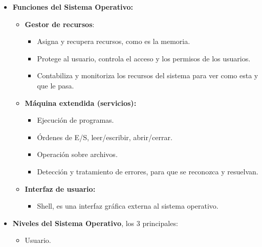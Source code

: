 \documentclass[12pt, twoside, openright]{report} %
\begin{document}
  \begin{itemize}
  \item \textbf{Funciones del Sistema Operativo:}
    

    \begin{itemize}
    \item \textbf{Gestor de recursos}:
      

      \begin{itemize}
      \item Asigna y recupera recursos, como es la memoria.
        
      \item Protege al usuario, controla el acceso y los permisos de los
        usuarios.
        
      \item Contabiliza y monitoriza los recursos del sistema para ver como
        esta y que le pasa.
        
      \end{itemize}
    \item \textbf{Máquina extendida (servicios):}
      

      \begin{itemize}
      \item Ejecución de programas.
        
      \item Órdenes de E/S, leer/escribir, abrir/cerrar.
        
      \item Operación sobre archivos.
        
      \item Detección y tratamiento de errores, para que se reconozca y
        resuelvan.
        
      \end{itemize}
    \item \textbf{Interfaz de usuario:}
      

      \begin{itemize}
      \item Shell, es una interfaz gráfica externa al sistema operativo.
        
      \end{itemize}
    \end{itemize}
  \item \textbf{Niveles del Sistema Operativo}, los 3 principales:
    

    \begin{itemize}
    \item Usuario.
      

\end{itemize}
\end{itemize}
\end{document}

